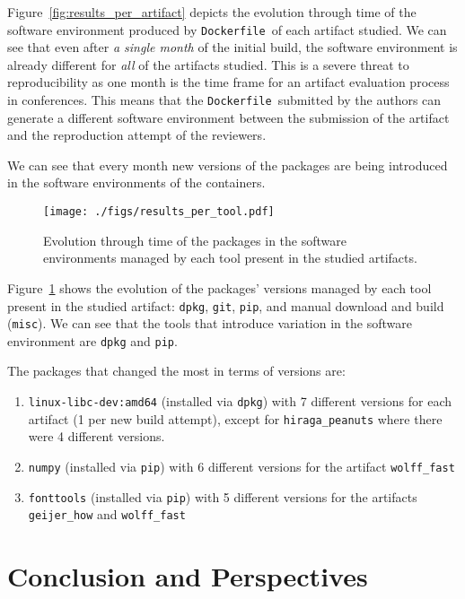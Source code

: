 \documentclass[sigconf,natbib=false]{acmart}
\newcommand{\df}{\texttt{Dockerfile}}
\begin{document}
Figure~\ref{fig:results_per_artifact} depicts the evolution through time of the software environment produced by \df\ of each artifact studied.
We can see that even after \emph{a single month} of the initial build, the software environment is already different for \emph{all} of the artifacts studied.
This is a severe threat to reproducibility as one month is the time frame for an artifact evaluation process in conferences.
This means that the \df\ submitted by the authors can generate a different software environment between the submission of the artifact and the reproduction attempt of the reviewers.


We can see that every month new versions of the packages are being introduced in the software environments of the containers.



\begin{figure}
  \centering
  \texttt{[image: ./figs/results\_per\_tool.pdf]}
  \caption{
    Evolution through time of the packages in the software environments managed by each tool present in the studied artifacts.
  }\label{fig:results_per_tool}
\end{figure}

Figure~\ref{fig:results_per_tool} shows the evolution of the packages' versions managed by each tool present in the studied artifact: \texttt{dpkg}, \texttt{git}, \texttt{pip}, and manual download and build (\texttt{misc}).
We can see that the tools that introduce variation in the software environment are \texttt{dpkg} and \texttt{pip}.

The packages that changed the most in terms of versions are:
\begin{enumerate}
\item \texttt{linux-libc-dev:amd64} (installed via \texttt{dpkg}) with 7 different versions for each artifact (1 per new build attempt), except for \texttt{hiraga\_peanuts} where there were 4 different versions.
\item \texttt{numpy} (installed via \texttt{pip}) with 6 different versions for the artifact \texttt{wolff\_fast}
\item \texttt{fonttools} (installed via \texttt{pip}) with 5 different versions for the artifacts \texttt{geijer\_how} and \texttt{wolff\_fast}
\end{enumerate}


\section{Conclusion and Perspectives}\label{sec:conclusion}
\end{document}
